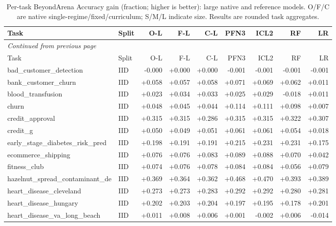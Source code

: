 \begin{longtable}{@{}p{3.95cm}lrrrrrrr@{}}
\caption{Per-task BeyondArena Accuracy gain (fraction; higher is better): large native and reference models. O/F/C are native single-regime/fixed/curriculum; S/M/L indicate size. Results are rounded task aggregates.}\label{tab:acclarge}\\
\toprule Task & Split & O-L & F-L & C-L & PFN3 & ICL2 & RF & LR\\\midrule
\endfirsthead
\multicolumn{9}{l}{\emph{Continued from previous page}}\\\toprule
Task & Split & O-L & F-L & C-L & PFN3 & ICL2 & RF & LR\\\midrule\endhead
\bottomrule\endfoot
bad\_\allowbreak{}customer\_\allowbreak{}detection & IID & -0.000 & +0.000 & +0.000 & -0.001 & -0.001 & -0.001 & -0.001\\
bank\_\allowbreak{}customer\_\allowbreak{}churn & IID & +0.058 & +0.057 & +0.058 & +0.071 & +0.069 & +0.062 & +0.011\\
blood\_\allowbreak{}transfusion & IID & +0.023 & +0.034 & +0.033 & +0.025 & +0.029 & -0.018 & +0.011\\
churn & IID & +0.048 & +0.045 & +0.044 & +0.114 & +0.111 & +0.098 & +0.007\\
credit\_\allowbreak{}approval & IID & +0.315 & +0.315 & +0.286 & +0.315 & +0.315 & +0.322 & +0.307\\
credit\_\allowbreak{}g & IID & +0.050 & +0.049 & +0.051 & +0.061 & +0.061 & +0.054 & +0.018\\
early\_\allowbreak{}stage\_\allowbreak{}diabetes\_\allowbreak{}risk\_\allowbreak{}pred & IID & +0.198 & +0.191 & +0.191 & +0.215 & +0.231 & +0.231 & +0.175\\
ecommerce\_\allowbreak{}shipping & IID & +0.076 & +0.076 & +0.083 & +0.089 & +0.088 & +0.070 & +0.042\\
fitness\_\allowbreak{}club & IID & +0.074 & +0.076 & +0.078 & +0.084 & +0.084 & +0.056 & +0.079\\
hazelnut\_\allowbreak{}spread\_\allowbreak{}contaminant\_\allowbreak{}de & IID & +0.369 & +0.364 & +0.362 & +0.468 & +0.470 & +0.393 & +0.389\\
heart\_\allowbreak{}disease\_\allowbreak{}cleveland & IID & +0.273 & +0.273 & +0.283 & +0.292 & +0.292 & +0.280 & +0.281\\
heart\_\allowbreak{}disease\_\allowbreak{}hungary & IID & +0.202 & +0.203 & +0.204 & +0.197 & +0.195 & +0.178 & +0.201\\
heart\_\allowbreak{}disease\_\allowbreak{}va\_\allowbreak{}long\_\allowbreak{}beach & IID & +0.011 & +0.008 & +0.006 & +0.001 & -0.002 & +0.006 & -0.014\\

\end{longtable}
